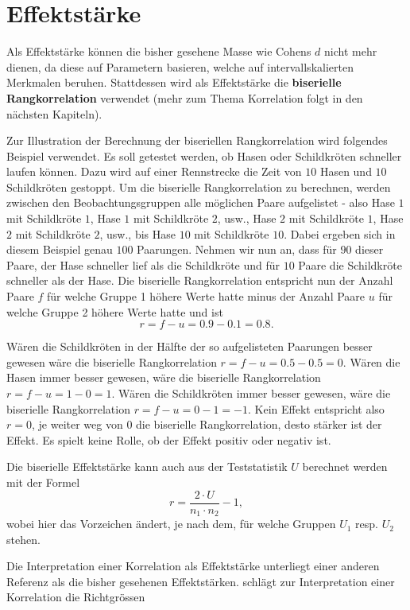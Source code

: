 \documentclass[
]{book}
\theoremstyle{definition}
\theoremstyle{definition}
\theoremstyle{definition}
\theoremstyle{definition}
\theoremstyle{remark}
\begin{document}
\section{Effektstärke}\label{u-test-effect}

Als Effektstärke können die bisher gesehene Masse wie Cohens \(d\) nicht
mehr dienen, da diese auf Parametern basieren, welche auf
intervallskalierten Merkmalen beruhen. Stattdessen wird als Effektstärke
die \label{customdef-biserielle-rangkorrelation}{\textbf{biserielle
Rangkorrelation}} verwendet (mehr zum Thema Korrelation folgt in den nächsten
Kapiteln).

Zur Illustration der Berechnung der biseriellen Rangkorrelation wird
folgendes Beispiel verwendet. Es soll getestet werden, ob Hasen oder
Schildkröten schneller laufen können. Dazu wird auf einer Rennstrecke
die Zeit von \(10\) Hasen und \(10\) Schildkröten gestoppt. Um die
biserielle Rangkorrelation zu berechnen, werden zwischen den
Beobachtungsgruppen alle möglichen Paare aufgelistet - also Hase \(1\) mit
Schildkröte \(1\), Hase \(1\) mit Schildkröte \(2\), usw., Hase \(2\) mit
Schildkröte \(1\), Hase \(2\) mit Schildkröte \(2\), usw., bis Hase \(10\) mit
Schildkröte \(10\). Dabei ergeben sich in diesem Beispiel genau \(100\)
Paarungen. Nehmen wir nun an, dass für \(90\) dieser Paare, der Hase
schneller lief als die Schildkröte und für \(10\) Paare die Schildkröte
schneller als der Hase. Die biserielle Rangkorrelation entspricht nun
der Anzahl Paare \(f\) für welche Gruppe 1 höhere Werte hatte minus der
Anzahl Paare \(u\) für welche Gruppe 2 höhere Werte hatte und ist
\[r = f - u = 0.9 - 0.1 = 0.8.\]

Wären die Schildkröten in der Hälfte der so aufgelisteten Paarungen
besser gewesen wäre die biserielle Rangkorrelation
\(r = f-u=0.5 - 0.5 = 0\). Wären die Hasen immer besser gewesen, wäre die
biserielle Rangkorrelation \(r = f-u = 1-0 = 1\). Wären die Schildkröten
immer besser gewesen, wäre die biserielle Rangkorrelation
\(r = f-u = 0-1 = -1\). Kein Effekt entspricht also \(r = 0\), je weiter weg
von \(0\) die biserielle Rangkorrelation, desto stärker ist der Effekt. Es
spielt keine Rolle, ob der Effekt positiv oder negativ ist.

Die biserielle Effektstärke kann auch aus der Teststatistik \(U\)
berechnet werden mit der Formel \[r = \frac{2\cdot U}{n_1\cdot n_2}-1,\]
wobei hier das Vorzeichen ändert, je nach dem, für welche Gruppen \(U_1\)
resp. \(U_2\) stehen.

Die Interpretation einer Korrelation als Effektstärke unterliegt einer
anderen Referenz als die bisher gesehenen Effektstärken. \citet{cohen1988}
schlägt zur Interpretation einer Korrelation die Richtgrössen
\end{document}
